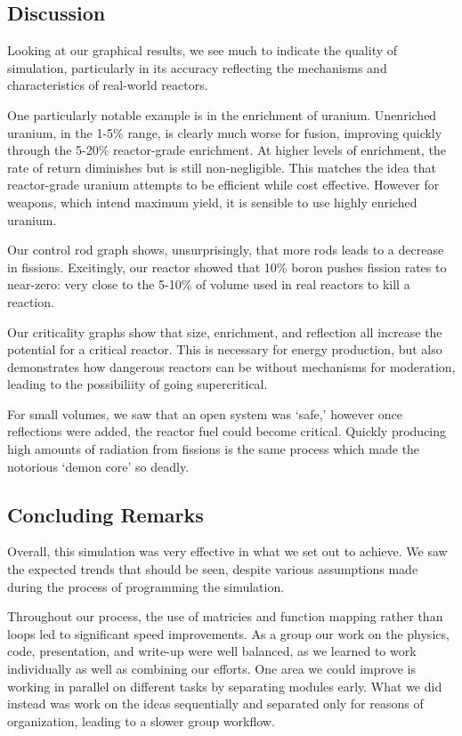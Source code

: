 \documentclass{notes}
\begin{document}
\subsection*{Discussion}

Looking at our graphical results, we see much to indicate the quality of simulation, particularly in its accuracy reflecting the mechanisms and characteristics of real-world reactors. 

One particularly notable example is in the enrichment of uranium. Unenriched uranium, in the 1-5\% range, is clearly much worse for fusion, improving quickly through the 5-20\% reactor-grade enrichment. At higher levels of enrichment, the rate of return diminishes but is still non-negligible. This matches the idea that reactor-grade uranium attempts to be efficient while cost effective. However for weapons, which intend maximum yield, it is sensible to use highly enriched uranium.

Our control rod graph shows, unsurprisingly, that more rods leads to a decrease in fissions. Excitingly, our reactor showed that 10\% boron pushes fission rates to near-zero: very close to the 5-10\% of volume used in real reactors to kill a reaction.

Our criticality graphs show that size, enrichment, and reflection all increase the potential for a critical reactor. This is necessary for energy production, but also demonstrates how dangerous reactors can be without mechanisms for moderation, leading to the possibiliity of going supercritical.

For small volumes, we saw that an open system was `safe,' however once reflections were added, the reactor fuel could become critical. Quickly producing high amounts of radiation from fissions is the same process which made the notorious `demon core' so deadly.

\subsection*{Concluding Remarks}

Overall, this simulation was very effective in what we set out to achieve. We saw the expected trends that should be seen, despite various assumptions made during the process of programming the simulation.

Throughout our process, the use of matricies and function mapping rather than loops led to significant speed improvements. As a group our work on the physics, code, presentation, and write-up were well balanced, as we learned to work individually as well as combining our efforts. One area we could improve is working in parallel on different tasks by separating modules early. What we did instead was work on the ideas sequentially and separated only for reasons of organization, leading to a slower group workflow.
\end{document}
